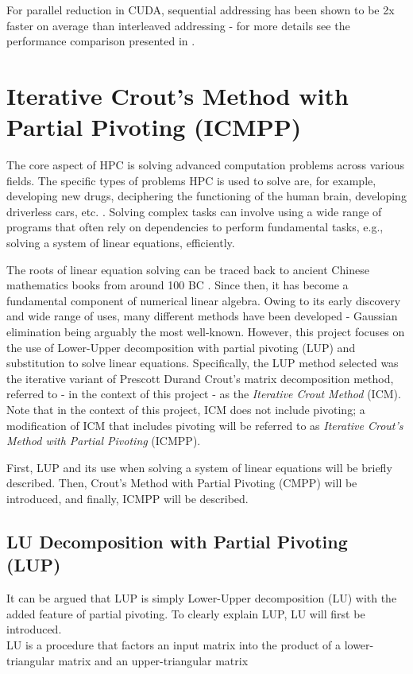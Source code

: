For parallel reduction in CUDA, sequential addressing has been shown to be 2x faster on average than interleaved addressing \cite{Harris2023} - for more details see the performance comparison presented in  \cite{Harris2023}.



\section{Iterative Crout's Method with Partial Pivoting (ICMPP)}\label{Section:theory->ICMPP}
The core aspect of HPC is solving advanced computation problems across various fields.
The specific types of problems HPC is used to solve are, for example, developing new drugs, deciphering the functioning of the human brain, developing driverless cars, etc. \cite{HY9P0YzuUCw5E5cs}.
Solving complex tasks can involve using a wide range of programs that often rely on dependencies to perform fundamental tasks, e.g., solving a system of linear equations, efficiently.

The roots of linear equation solving can be traced back to ancient Chinese mathematics books from around 100 BC \cite{Hart2011}.
Since then, it has become a fundamental component of numerical linear algebra.
Owing to its early discovery and wide range of uses, many different methods have been developed - Gaussian elimination being arguably the most well-known.
However, this project focuses on the use of Lower-Upper decomposition with partial pivoting (LUP) and substitution to solve linear equations.
Specifically, the LUP method selected was the iterative variant of Prescott Durand Crout's matrix decomposition method, referred to - in the context of this project - as the \textit{Iterative Crout Method} (ICM).
Note that in the context of this project, ICM does not include pivoting; a modification of ICM that includes pivoting will be referred to as \textit{Iterative Crout's Method with Partial Pivoting} (ICMPP).

First, LUP and its use when solving a system of linear equations will be briefly described.
Then, Crout's Method with Partial Pivoting (CMPP) will be introduced, and finally, ICMPP will be described.

\subsection{LU Decomposition with Partial Pivoting (LUP)}\label{Subsection:theory->ICMPP->LUP}
It can be argued that LUP is simply Lower-Upper decomposition (LU) with the added feature of partial pivoting.
To clearly explain LUP, LU will first be introduced.\\
LU is a procedure that factors an input matrix into the product of a lower-triangular matrix and an upper-triangular matrix

